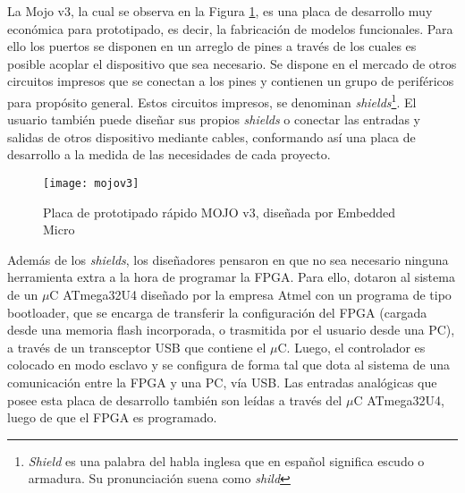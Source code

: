 La Mojo v3, la cual se observa en la Figura \ref{mojo}, es una placa de desarrollo muy económica para prototipado, es decir, la fabricación de modelos funcionales. Para ello los puertos se disponen en un arreglo de pines a través de los cuales es posible acoplar el dispositivo que sea necesario. Se dispone en el mercado de otros circuitos impresos que se conectan a los pines y contienen un grupo de periféricos para propósito general. Estos circuitos impresos, se denominan \textit{shields}\footnote{ \textit{Shield} es una palabra del habla inglesa que en español significa escudo o armadura. Su pronunciación suena como \textit{shild}}. El usuario también puede diseñar sus propios \textit{shields} o conectar las entradas y salidas de otros dispositivo mediante cables, conformando así una placa de desarrollo a la medida de las necesidades de cada proyecto.%

\begin{figure}[ht]
	\centering
	\texttt{[image: mojov3]}
	\caption{Placa de prototipado rápido MOJO v3, diseñada por Embedded Micro}
	\label{mojo}
\end{figure}

Además de los \textit{shields}, los diseñadores pensaron en que no sea necesario ninguna herramienta extra a la hora de programar la FPGA. Para ello, dotaron al sistema de un $\mu$C ATmega32U4 diseñado por la empresa Atmel con un programa de tipo bootloader, que se encarga de transferir la configuración del FPGA (cargada desde una memoria flash incorporada, o trasmitida por el usuario desde una PC), a través de un transceptor USB que contiene el $\mu$C. Luego, el controlador es colocado en modo esclavo y se configura de forma tal que dota al sistema de una comunicación entre la FPGA y una PC, vía USB. Las entradas analógicas que posee esta placa de desarrollo también son leídas a través del $\mu$C ATmega32U4, luego de que el FPGA es programado.%

